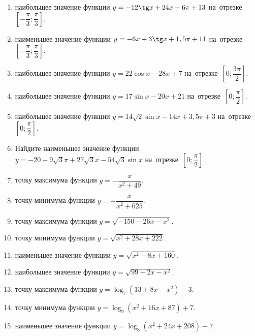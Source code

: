 \documentclass[a4paper,10pt]{article}
\begin{document}
\begin{enumerate}
\item {} наибольшее значение функции $y=-12\tg x +24x-6\pi +13$ на~отрезке~$\left[-\dfrac{\pi}{3};\dfrac{\pi}{3}\right]$.

\item {} наименьшее значение функции $y=-6x +3\tg x+1,5\pi+11$ на~отрезке~$\left[-\dfrac{\pi}{3};\dfrac{\pi}{3}\right]$.

\item {} наибольшее значение функции $y=22\cos x-28x+7$ на~отрезке~$\left[0;\dfrac{3\pi}{2}\right]$.

\item {} наибольшее значение функции $y=17\sin x-20x+21$ на~отрезке~$\left[0;\dfrac{\pi}{2}\right]$.

\item {} наибольшее значение функции $y=14\sqrt{2}\sin x-14x+3,5\pi +3$ на~отрезке~$\left[0;\dfrac{\pi}{2}\right]$.

\item Найдите наименьшее значение функции $y=-20-9\sqrt{3}\pi+27\sqrt{3}x-54\sqrt{3}\sin x$ на~отрезке~$\left[0;\dfrac{\pi}{2}\right]$.

\item {} точку максимума функции $y=-\dfrac{x}{ x^2 +49}$.

\item {} точку минимума функции $y=-\dfrac{x}{ x^2 +625}$.

\item {} точку максимума функции $y=\sqrt{-150-26x-x^2}$.

\item {} точку минимума функции $y=\sqrt{x^2+28x+222}$.

\item {} наименьшее значение функции $y=\sqrt{x^2-8x+160}$.

\item {} наибольшее значение функции $y=\sqrt{99-2x-x^2}$.

\item {} точку максимума функции $y=\log_7\left(13+8x-x^2\right)-3$.

\item {} точку минимума функции $y=\log_9\left(x^2+16x+87\right)+7$.

\item {} наименьшее значение функции $y=\log_8\left(x^2+24x+208\right)+7$.


\end{enumerate}
\end{document}
